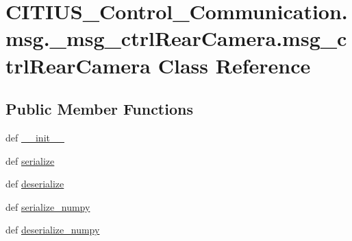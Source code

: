 \hypertarget{class_c_i_t_i_u_s___control___communication_1_1msg_1_1__msg__ctrl_rear_camera_1_1msg__ctrl_rear_camera}{\section{\-C\-I\-T\-I\-U\-S\-\_\-\-Control\-\_\-\-Communication.\-msg.\-\_\-msg\-\_\-ctrl\-Rear\-Camera.\-msg\-\_\-ctrl\-Rear\-Camera \-Class \-Reference}
\label{class_c_i_t_i_u_s___control___communication_1_1msg_1_1__msg__ctrl_rear_camera_1_1msg__ctrl_rear_camera}
}
\subsection*{\-Public \-Member \-Functions}
\begin{DoxyCompactItemize}
\item 
def \hyperlink{class_c_i_t_i_u_s___control___communication_1_1msg_1_1__msg__ctrl_rear_camera_1_1msg__ctrl_rear_camera_ab6110462ebbe8103da40a1d8dd66940f}{\-\_\-\-\_\-init\-\_\-\-\_\-}
\item 
def \hyperlink{class_c_i_t_i_u_s___control___communication_1_1msg_1_1__msg__ctrl_rear_camera_1_1msg__ctrl_rear_camera_a3144039adebe29da11ae8012bef9f4fc}{serialize}
\item 
def \hyperlink{class_c_i_t_i_u_s___control___communication_1_1msg_1_1__msg__ctrl_rear_camera_1_1msg__ctrl_rear_camera_ae56f79f1aebb6421dfc568edf71b8882}{deserialize}
\item 
def \hyperlink{class_c_i_t_i_u_s___control___communication_1_1msg_1_1__msg__ctrl_rear_camera_1_1msg__ctrl_rear_camera_a6085de8e5cb269ae82e282b2ff7e342e}{serialize\-\_\-numpy}
\item 
def \hyperlink{class_c_i_t_i_u_s___control___communication_1_1msg_1_1__msg__ctrl_rear_camera_1_1msg__ctrl_rear_camera_a098449e87e6c7f5702194f71007b7297}{deserialize\-\_\-numpy}
\end{DoxyCompactItemize}
